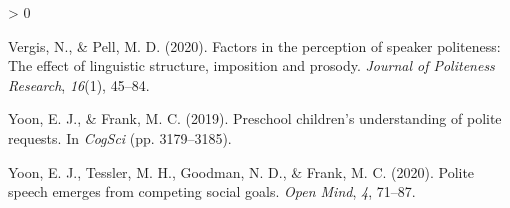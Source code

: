 \documentclass[
  english,
  man,floatsintext]{apa6}
\newlength{\cslhangindent}
\newenvironment{CSLReferences}[2] %
 {%
  \setlength{\parindent}{0pt}
  \ifodd #1 \everypar{\setlength{\hangindent}{\cslhangindent}}\ignorespaces\fi
  \ifnum #2 > 0
  \setlength{\parskip}{#2\baselineskip}
  \fi
 }%
 {}
\begin{document}
\begin{CSLReferences}{1}{0}
\leavevmode\hypertarget{ref-vergis2020}{}%
Vergis, N., \& Pell, M. D. (2020). Factors in the perception of speaker politeness: The effect of linguistic structure, imposition and prosody. \emph{Journal of Politeness Research}, \emph{16}(1), 45--84.

\leavevmode\hypertarget{ref-yoon2019}{}%
Yoon, E. J., \& Frank, M. C. (2019). Preschool children's understanding of polite requests. In \emph{CogSci} (pp. 3179--3185).

\leavevmode\hypertarget{ref-yoon2020}{}%
Yoon, E. J., Tessler, M. H., Goodman, N. D., \& Frank, M. C. (2020). Polite speech emerges from competing social goals. \emph{Open Mind}, \emph{4}, 71--87.

\end{CSLReferences}

\endgroup
\end{document}
